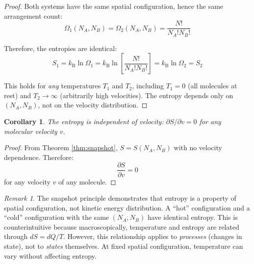 \documentclass[10pt,twocolumn,letterpaper]{article}
\newtheorem{corollary}[theorem]{Corollary}
\theoremstyle{definition}
\theoremstyle{remark}
\newtheorem{remark}[theorem]{Remark}
\newcommand{\kb}{k_\text{B}}
\newcommand{\pderiv}[2]{\frac{\partial #1}{\partial #2}}
\newcommand{\Om}{\Omega}
\begin{document}
\begin{proof}
Both systems have the same spatial configuration, hence the same arrangement count:
\begin{equation}
\Om_1(N_A, N_B) = \Om_2(N_A, N_B) = \frac{N!}{N_A! N_B!}
\end{equation}

Therefore, the entropies are identical:
\begin{equation}
S_1 = \kb \ln \Om_1 = \kb \ln\left[\frac{N!}{N_A! N_B!}\right] = \kb \ln \Om_2 = S_2
\end{equation}

This holds for \textit{any} temperatures $T_1$ and $T_2$, including $T_1 = 0$ (all molecules at rest) and $T_2 \to \infty$ (arbitrarily high velocities). The entropy depends only on $(N_A, N_B)$, not on the velocity distribution.
\end{proof}

\begin{corollary}
\label{cor:velocity_entropy_indep}
The entropy is independent of velocity: $\partial S/\partial v = 0$ for any molecular velocity $v$.
\end{corollary}

\begin{proof}
From Theorem \ref{thm:snapshot}, $S = S(N_A, N_B)$ with no velocity dependence. Therefore:
\begin{equation}
\pderiv{S}{v} = 0
\end{equation}
for any velocity $v$ of any molecule.
\end{proof}

\begin{remark}
The snapshot principle demonstrates that entropy is a property of spatial configuration, not kinetic energy distribution. A ``hot'' configuration and a ``cold'' configuration with the same $(N_A, N_B)$ have identical entropy. This is counterintuitive because macroscopically, temperature and entropy are related through $dS = dQ/T$. However, this relationship applies to \textit{processes} (changes in state), not to \textit{states} themselves. At fixed spatial configuration, temperature can vary without affecting entropy.
\end{remark}
\end{document}
